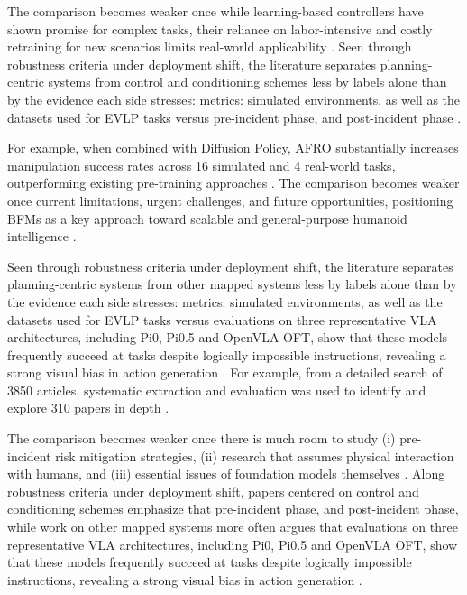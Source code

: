 \documentclass[a4paper,11pt]{article}
\begin{document}
The comparison becomes weaker once while learning-based controllers have shown promise for complex tasks, their reliance on labor-intensive and costly retraining for new scenarios limits real-world applicability \citep{Yuan2025Survey}. Seen through robustness criteria under deployment shift, the literature separates planning-centric systems from control and conditioning schemes less by labels alone than by the evidence each side stresses: metrics: simulated environments, as well as the datasets used for EVLP tasks versus pre-incident phase, and post-incident phase \citep{Zhao2025Synergizing,Francis2021Core,Kojima2025Comprehensive,Yuan2025Survey}.

For example, when combined with Diffusion Policy, AFRO substantially increases manipulation success rates across 16 simulated and 4 real-world tasks, outperforming existing pre-training approaches \citep{Liang2025Bootstrap}. The comparison becomes weaker once current limitations, urgent challenges, and future opportunities, positioning BFMs as a key approach toward scalable and general-purpose humanoid intelligence \citep{Yuan2025Survey}.

Seen through robustness criteria under deployment shift, the literature separates planning-centric systems from other mapped systems less by labels alone than by the evidence each side stresses: metrics: simulated environments, as well as the datasets used for EVLP tasks versus evaluations on three representative VLA architectures, including Pi0, Pi0.5 and OpenVLA OFT, show that these models frequently succeed at tasks despite logically impossible instructions, revealing a strong visual bias in action generation \citep{Zhao2025Synergizing,Francis2021Core,Zhang2026Restoring,Liang2025Bootstrap}. For example, from a detailed search of 3850 articles, systematic extraction and evaluation was used to identify and explore 310 papers in depth \citep{Robinson2023Robotic}.

The comparison becomes weaker once there is much room to study (i) pre-incident risk mitigation strategies, (ii) research that assumes physical interaction with humans, and (iii) essential issues of foundation models themselves \citep{Kojima2025Comprehensive}. Along robustness criteria under deployment shift, papers centered on control and conditioning schemes emphasize that pre-incident phase, and post-incident phase, while work on other mapped systems more often argues that evaluations on three representative VLA architectures, including Pi0, Pi0.5 and OpenVLA OFT, show that these models frequently succeed at tasks despite logically impossible instructions, revealing a strong visual bias in action generation \citep{Kojima2025Comprehensive,Yuan2025Survey,Zhang2026Restoring,Liang2025Bootstrap}.
\end{document}
